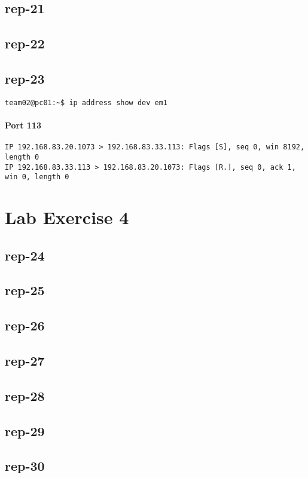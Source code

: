 \documentclass{article}
\begin{document}
\subsection{rep-21}
\subsection{rep-22}
\subsection{rep-23}

\begin{lstlisting}[label=listing:ip-command,caption={Command used to obtain IP address}]
team02@pc01:~$ ip address show dev em1
\end{lstlisting}

\paragraph{Port 113}
\begin{Verbatim}
IP 192.168.83.20.1073 > 192.168.83.33.113: Flags [S], seq 0, win 8192, length 0
IP 192.168.83.33.113 > 192.168.83.20.1073: Flags [R.], seq 0, ack 1, win 0, length 0
\end{Verbatim}

\section{Lab Exercise 4}

\subsection{rep-24}
\subsection{rep-25}
\subsection{rep-26}
\subsection{rep-27}
\subsection{rep-28}
\subsection{rep-29}
\subsection{rep-30}
\end{document}
